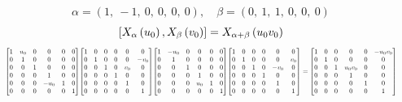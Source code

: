 \documentclass[11pt]{article}
\theoremstyle{definition}
\begin{document}
\[
\alpha = \left( 1, \  -1, \  0, \  0, \  0, \  0\right), \quad \beta = \left( 0, \  1, \  1, \  0, \  0, \  0\right)
\]
\[
\scaletoalign{\textwidth}{\left[ X_{\alpha}\left(u_{0}\right), X_{\beta}\left(v_{0}\right) \right] = X_{\alpha + \beta}\left(u_{0} v_{0}\right)}
\]
\[
\scaletoalign{\textwidth}{{\left[\begin{matrix}1 & u_{0} & 0 & 0 & 0 & 0\\0 & 1 & 0 & 0 & 0 & 0\\0 & 0 & 1 & 0 & 0 & 0\\0 & 0 & 0 & 1 & 0 & 0\\0 & 0 & 0 & - u_{0} & 1 & 0\\0 & 0 & 0 & 0 & 0 & 1\end{matrix}\right]} {\left[\begin{matrix}1 & 0 & 0 & 0 & 0 & 0\\0 & 1 & 0 & 0 & 0 & - v_{0}\\0 & 0 & 1 & 0 & v_{0} & 0\\0 & 0 & 0 & 1 & 0 & 0\\0 & 0 & 0 & 0 & 1 & 0\\0 & 0 & 0 & 0 & 0 & 1\end{matrix}\right]} {\left[\begin{matrix}1 & - u_{0} & 0 & 0 & 0 & 0\\0 & 1 & 0 & 0 & 0 & 0\\0 & 0 & 1 & 0 & 0 & 0\\0 & 0 & 0 & 1 & 0 & 0\\0 & 0 & 0 & u_{0} & 1 & 0\\0 & 0 & 0 & 0 & 0 & 1\end{matrix}\right]} {\left[\begin{matrix}1 & 0 & 0 & 0 & 0 & 0\\0 & 1 & 0 & 0 & 0 & v_{0}\\0 & 0 & 1 & 0 & - v_{0} & 0\\0 & 0 & 0 & 1 & 0 & 0\\0 & 0 & 0 & 0 & 1 & 0\\0 & 0 & 0 & 0 & 0 & 1\end{matrix}\right]} = {\left[\begin{matrix}1 & 0 & 0 & 0 & 0 & - u_{0} v_{0}\\0 & 1 & 0 & 0 & 0 & 0\\0 & 0 & 1 & u_{0} v_{0} & 0 & 0\\0 & 0 & 0 & 1 & 0 & 0\\0 & 0 & 0 & 0 & 1 & 0\\0 & 0 & 0 & 0 & 0 & 1\end{matrix}\right]}}
\]
\end{document}
